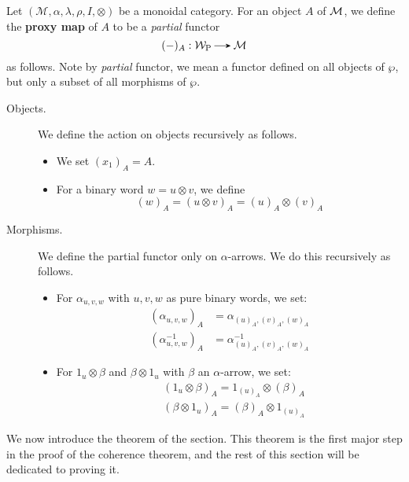 \begin{definition}
    Let $(\mathcal{M}, \alpha, \lambda, \rho, I, \otimes)$ be a monoidal 
    category. For an object $A$ of $\mathcal{M}$, we 
    define the \textbf{proxy map} of $A$ to be a \emph{partial} functor
    \[
        (-)_A: \wp \to \mm
    \]
    as follows. Note by \emph{partial} functor, we mean a functor defined on all objects 
    of $\wp$, but only a subset of all morphisms of $\wp$. 
    
    \begin{description}
        \item[Objects.] 
        We define the action on objects recursively as follows.
        \begin{itemize}
            \item We set $(x_1)_A
             = A$.
            \item For a binary word $w = u \otimes v$, we define 
            \[
                (w)_A
                =
                (u\otimes  v)_A
                = 
                (u)_A \otimes (v)_A
            \]  
        \end{itemize}

        \item[Morphisms.] We define the partial functor only on 
        $\alpha$-arrows. We do this recursively as follows.
        \begin{itemize}
            \item For $\alpha_{u,v,w}$ with $u,v,w$ as pure binary words,
            we set:
            \begin{align*}
                (\alpha_{u,v,w})_A &= \alpha_{(u)_A,(v)_A,(w)_A}\\
                (\alpha^{-1}_{u,v,w})_A &= \alpha^{-1}_{(u)_A,(v)_A,(w)_A}
            \end{align*}
            \item For $1_{u} \otimes \beta$ 
            and $\beta \otimes 1_{u}$ with $\beta$ an $\alpha$-arrow, we set:
            \begin{align*}
                &(1_{u} \otimes \beta)_A = 1_{(u)_A} \otimes (\beta)_A\\ 
                &(\beta \otimes 1_{u})_A = (\beta)_A\otimes 1_{(u)_A}
            \end{align*}
        \end{itemize}
    \end{description}
\end{definition}

We now introduce the theorem of the section. This theorem is the first major 
step in the proof of the coherence theorem, and the  rest of this section will 
be dedicated to proving it. 

